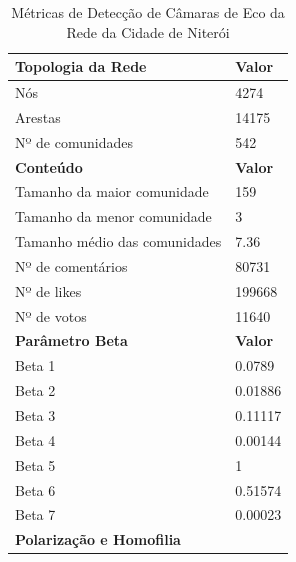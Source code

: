 \begin{table}[ht]
	\centering
	\caption{Métricas de Detecção de Câmaras de Eco da Rede da Cidade de Niterói}
	\label{tab:echo-chamber-metrics-niteroi}
	\begin{tabular}{l|l}
		\toprule
		\textbf{Topologia da Rede}          & \textbf{Valor}                   \\
		\midrule
		Nós                                 & 4274                             \\
		Arestas                             & 14175                            \\
		Nº de comunidades                   & 542                              \\
		\toprule
		\textbf{Conteúdo}                   & \textbf{Valor}                   \\
		\midrule
		Tamanho da maior comunidade         & 159                              \\
		Tamanho da menor comunidade         & 3                                \\
		Tamanho médio das comunidades       & 7.36                             \\
		Nº de comentários                   & 80731                            \\
		Nº de likes                         & 199668                           \\
		Nº de votos                         & 11640                            \\
		\midrule
		\textbf{Parâmetro Beta}             & \textbf{Valor}                   \\
		\midrule
		Beta 1                              & 0.0789                           \\
		Beta 2                              & 0.01886                          \\
		Beta 3                              & 0.11117                          \\
		Beta 4                              & 0.00144                          \\
		Beta 5                              & 1                                \\
		Beta 6                              & 0.51574                          \\
		Beta 7                              & 0.00023                          \\
		\midrule
		\textbf{Polarização e Homofilia}    &                                  \\

\end{tabular}
\end{table}
